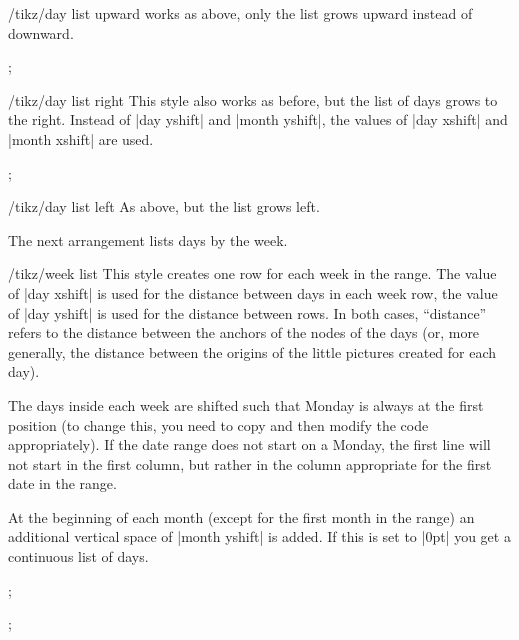 \begin{stylekey}{/tikz/day list upward}
  works as above, only the list grows upward instead of downward.
\begin{codeexample}[]
\tikz
  \calendar [dates=2000-01-28 to 2000-02-03,
             day list upward,month yshift=1em];
\end{codeexample}
\end{stylekey}

\begin{stylekey}{/tikz/day list right}
  This style also works as before, but the list of days grows to the
  right. Instead of |day yshift| and |month yshift|, the values of
  |day xshift| and |month xshift| are used.
\begin{codeexample}[]
\tikz
  \calendar [dates=2000-01-28 to 2000-02-03,
             day list right,month xshift=1em];
\end{codeexample}
\end{stylekey}

\begin{stylekey}{/tikz/day list left}
  As above, but the list grows left.
\end{stylekey}

The next arrangement lists days by the week.

\begin{stylekey}{/tikz/week list}
  This style creates one row for each week in the range. The value
  of |day xshift| is used for the distance between days in each week
  row, the value of |day yshift| is used for the distance between
  rows. In both cases, ``distance''  refers to the distance between
  the anchors of the nodes of the days (or, more generally, the
  distance between the origins of the little pictures created for each
  day).

  The days inside each week are shifted such that Monday is always
  at the first position (to change this, you need to copy and then
  modify the code appropriately). If the date range does not start on
  a Monday, the first line will not start in the first column, but
  rather in the column appropriate for the first date in the range.

  At the beginning of each month (except for the first month in the
  range) an additional vertical space of |month yshift| is added. If
  this is set to |0pt| you get a continuous list of days.
\begin{codeexample}[]
\tikz
  \calendar [dates=2000-01-01 to 2000-02-last,week list];
\end{codeexample}
\begin{codeexample}[]
\tikz
  \calendar [dates=2000-01-01 to 2000-02-last,week list,
             month yshift=0pt];
\end{codeexample}
\end{stylekey}

